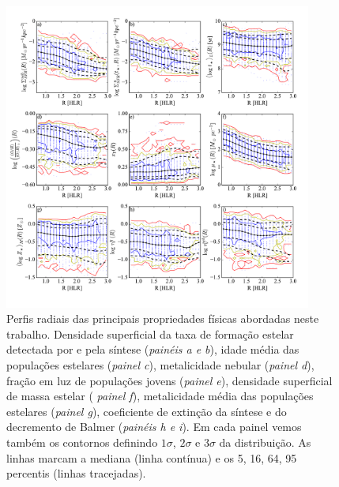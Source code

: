 \begin{figure}
	\centering
	\includegraphics[width=0.9\textwidth]{figuras/props_R.pdf}
	\caption[Perfis radiais das propriedades físicas.]
	{Perfis radiais das principais propriedades físicas abordadas neste trabalho. Densidade
superficial da taxa de formação estelar detectada por \Halpha e pela síntese ({\em painéis a e
b}), idade média das populações estelares ({\em painel c}), metalicidade nebular ({\em painel d}),
fração em luz de populações jovens ({\em painel e}), densidade superficial de massa estelar ({\em
painel f}), metalicidade média das populações estelares ({\em painel g}), coeficiente de extinção da
síntese e do decremento de Balmer ({\em painéis h e i}). Em cada painel vemos também os contornos
definindo $1\sigma$, $2\sigma$ e $3\sigma$ da distribuição. As linhas marcam a mediana (linha
contínua) e os 5, 16, 64, 95 percentis (linhas tracejadas).}
	\label{fig:RadProfProps}
\end{figure}

